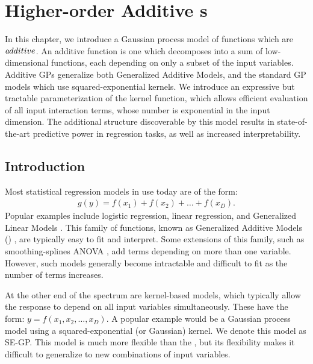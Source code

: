 
\inbpdocument



\chapter{Higher-order Additive \sgp{}s}
\label{ch:additive}








In this chapter, we introduce a Gaussian process model of functions which are $\textit additive$.
An additive function is one which decomposes into a sum of low-dimensional functions, each depending on only a subset of the input variables.
Additive GPs generalize both Generalized Additive Models, and the standard GP models which use squared-exponential kernels.
We introduce an expressive but tractable parameterization of the kernel function, which allows efficient evaluation of all input interaction terms, whose number is exponential in the input dimension.
The additional structure discoverable by this model results in state-of-the-art predictive power in regression tasks, as well as increased interpretability.

\section{Introduction}
Most statistical regression models in use today are of the form:
%
\begin{align}
g(y) = f(x_1) + f(x_2) + \dots + f(x_D).
\end{align}
%
Popular examples include logistic regression, linear regression, and Generalized Linear Models \citep{nelder1972generalized}.
This family of functions, known as Generalized Additive Models (\GAM{}) \citep{hastie1990generalized}, are typically easy to fit and interpret.
Some extensions of this family, such as smoothing-splines ANOVA \citep{wahba1990spline}, add terms depending on more than one variable.
However, such models generally become intractable and difficult to fit as the number of terms increases.

At the other end of the spectrum are kernel-based models, which typically allow the response to depend on all input variables simultaneously.
These have the form: $y = f(x_1, x_2, \dots, x_D)$.
A popular example would be a Gaussian process model using a squared-exponential (or Gaussian) kernel.
We denote this model as SE-GP.
This model is much more flexible than the \GAM{}, but its flexibility makes it difficult to generalize to new combinations of input variables.

